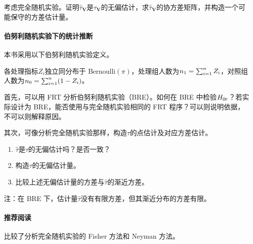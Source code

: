 考虑完全随机实验。证明$\widehat{ \tau}_{\bm{V}} $是$\tau_{\bm{V}} $的无偏估计，求$\widehat{ \tau}_{\bm{V}} $的协方差矩阵，并构造一个可能保守的方差估计量。 


\paragraph{伯努利随机实验下的统计推断}\label{hw::bre-inference}


本书采用以下伯努利随机实验定义。

\begin{definition}
[BRE]\label{def::BRE}
各处理指标$Z_i$独立同分布于 Bernoulli$(\pi)$，处理组人数为$n_1 = \sum_{i=1}^n Z_i$，对照组人数为$n_0 = \sum_{i=1}^n (1-Z_i)$。 
\end{definition}



首先，可以用 FRT 分析伯努利随机实验（BRE）。如何在 BRE 中检验$H_{0\textsc{f}}$？若实际设计为 BRE，能否使用与完全随机实验相同的 FRT 程序？可以则说明依据，不可以则解释原因。

其次，可像\citet{Neyman:1923}分析完全随机实验那样，构造$\tau$的点估计及对应方差估计。 
\begin{enumerate}
\item
$\hat{\tau}$是$\tau$的无偏估计吗？是否一致？
\item
构造$\tau$的无偏估计量。
\item
比较上述无偏估计量的方差与$\hat{\tau}$的渐近方差。 
\end{enumerate}

注：在 BRE 下，估计量$\hat{\tau}$没有有限方差，但其渐近分布的方差有限。 



\paragraph{推荐阅读}

 \citet{Ding:2014}比较了分析完全随机实验的 Fisher 方法和 Neyman 方法。 


